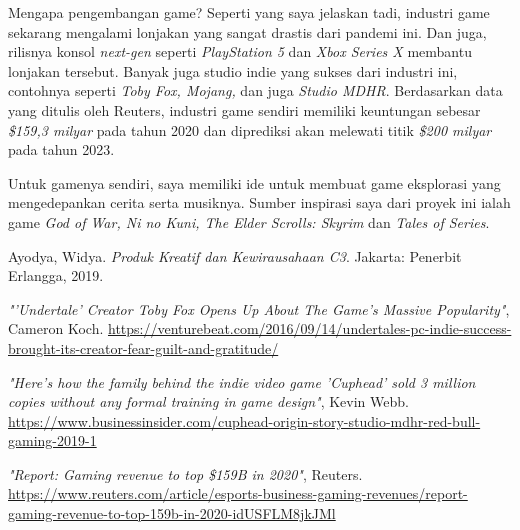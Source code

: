 \documentclass[12pt,a4paper]{report}
\begin{document}
    Mengapa pengembangan game? Seperti yang saya jelaskan tadi, industri game sekarang mengalami lonjakan yang sangat drastis dari pandemi ini. Dan juga, rilisnya konsol \textit{next-gen} seperti \emph{PlayStation 5} dan \emph{Xbox Series X} membantu lonjakan tersebut. Banyak juga studio indie yang sukses dari industri ini, contohnya seperti \textit{Toby Fox\cite{tobyf}, Mojang,} dan juga \textit{Studio MDHR}\cite{mdhr}. Berdasarkan data yang ditulis oleh Reuters, industri game sendiri memiliki keuntungan sebesar \emph{\$159,3 milyar} pada tahun 2020 dan diprediksi akan melewati titik \emph{\$200 milyar} pada tahun 2023\cite{reuters1}.

    Untuk gamenya sendiri, saya memiliki ide untuk membuat game eksplorasi yang mengedepankan cerita serta musiknya. Sumber inspirasi saya dari proyek ini ialah game \emph{God of War, Ni no Kuni, The Elder Scrolls: Skyrim} dan \emph{Tales of Series}.
    
    \begin{thebibliography}{9}
        
            Ayodya, Widya. \textit{Produk Kreatif dan Kewirausahaan C3}. Jakarta: Penerbit Erlangga, 2019.

            \textit{"'Undertale' Creator Toby Fox Opens Up About The Game's Massive Popularity"}, Cameron Koch.
            \url{https://venturebeat.com/2016/09/14/undertales-pc-indie-success-brought-its-creator-fear-guilt-and-gratitude/}

            \textit{"Here's how the family behind the indie video game 'Cuphead' sold 3 million copies without any formal training in game design"}, Kevin Webb.
            \url{https://www.businessinsider.com/cuphead-origin-story-studio-mdhr-red-bull-gaming-2019-1}

            \textit{"Report: Gaming revenue to top \$159B in 2020"}, Reuters. \url{https://www.reuters.com/article/esports-business-gaming-revenues/report-gaming-revenue-to-top-159b-in-2020-idUSFLM8jkJMl}       

    \end{thebibliography}
\end{document}
